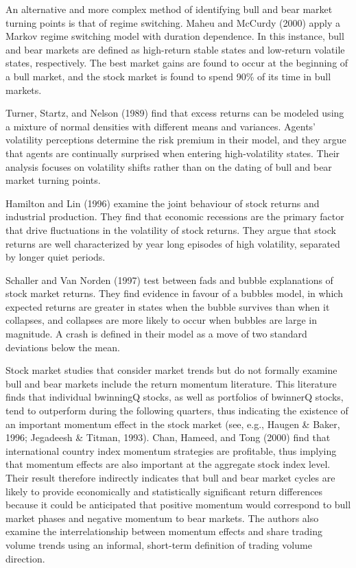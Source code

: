 \documentclass[]{book}
\begin{document}
An alternative and more complex method of identifying bull and bear market turning points is that of regime switching. Maheu and McCurdy (2000) apply a Markov regime switching model with duration dependence. In this instance, bull and bear markets are defined as high-return stable states and low-return volatile states, respectively. The best market gains are found to occur at the beginning of a bull market, and the stock market is found to spend 90\% of its time in bull markets.

Turner, Startz, and Nelson (1989) find that excess returns can be modeled using a mixture of normal densities with different means and variances. Agents' volatility perceptions determine the risk premium in their model, and they argue that agents are continually surprised when entering high-volatility states. Their analysis focuses on volatility shifts rather than on the dating of bull and bear market turning points.

Hamilton and Lin (1996) examine the joint behaviour of stock returns and industrial production. They find that economic recessions are the primary factor that drive fluctuations in the volatility of stock returns. They argue that stock returns are well characterized by year long episodes of high volatility, separated by longer quiet periods.

Schaller and Van Norden (1997) test between fads and bubble explanations of stock market returns. They find evidence in favour of a bubbles model, in which expected returns are greater in states when the bubble survives than when it collapses, and collapses are more likely to occur when bubbles are large
in magnitude. A crash is defined in their model as a move of two standard deviations below the mean.

Stock market studies that consider market trends but do not formally examine bull and bear markets include the return momentum literature. This literature finds that individual bwinningQ stocks, as well as portfolios of bwinnerQ stocks, tend to outperform during the following quarters, thus indicating the existence of an important momentum effect in the stock market (see, e.g., Haugen \& Baker, 1996; Jegadeesh \& Titman, 1993). Chan, Hameed, and Tong (2000) find that international country index momentum strategies are profitable, thus implying that momentum effects are also important at the aggregate stock index level. Their result therefore indirectly indicates that bull and bear market cycles are likely to provide economically and statistically significant return differences because it could be anticipated that positive momentum would correspond to bull market phases and negative momentum to bear markets. The authors also examine the interrelationship between momentum effects and share trading volume trends using an informal, short-term definition of trading volume direction.
\end{document}
